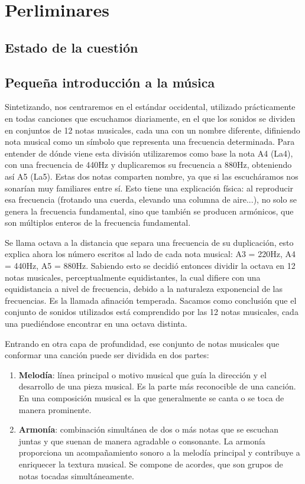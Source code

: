 \chapter{Perliminares}

\section{Estado de la cuestión}

\section{Pequeña introducción a la música}\label{sec:arm:armonia}

\label{arm:notas_musicales}
Sintetizando, nos centraremos en el estándar occidental, utilizado prácticamente en todas canciones que escuchamos diariamente, en el que los sonidos se dividen en conjuntos de 12 notas musicales, cada una con un nombre diferente, difiniendo nota musical como un símbolo que representa una frecuencia determinada. Para entender de dónde viene esta división utilizaremos como base la nota A4 (La4), con una frecuencia de 440Hz y duplicaremos su frecuencia a 880Hz, obteniendo así A5 (La5). Estas dos notas comparten nombre, ya que si las escucháramos nos sonarían muy familiares entre sí. Esto tiene una explicación física: al reproducir esa frecuencia (frotando una cuerda, elevando una columna de aire...), no solo se genera la frecuencia fundamental, sino que también se producen armónicos, que son múltiplos enteros de la frecuencia fundamental. 

Se llama octava a la distancia que separa una frecuencia de su duplicación, esto explica ahora los número escritos al lado de cada nota musical: A3 = 220Hz, A4 = 440Hz, A5 = 880Hz. Sabiendo esto se decidió entonces dividir la octava en 12 notas musicales, perceptualmente equidistantes, la cual difiere con una equidistancia a nivel de frecuencia, debido a la naturaleza exponencial de las frecuencias. Es la llamada afinación temperada. Sacamos como conclusión que el conjunto de sonidos utilizados está comprendido por las 12 notas musicales, cada una puediéndose encontrar en una octava distinta. 

Entrando en otra capa de profundidad, ese conjunto de notas musicales que conformar una canción puede ser dividida en dos partes:
\begin{enumerate}
    \item[\textbullet] \textbf{Melodía}: línea principal o motivo musical que guía la dirección y el desarrollo de una pieza musical. Es la parte más reconocible de una canción. En una composición musical es la que generalmente se canta o se toca de manera prominente.
    \item[\textbullet] \textbf{Armonía}: combinación simultánea de dos o más notas que se escuchan juntas y que suenan de manera agradable o consonante. La armonía proporciona un acompañamiento sonoro a la melodía principal y contribuye a enriquecer la textura musical. Se compone de acordes, que son grupos de notas tocadas simultáneamente.
\end{enumerate}

